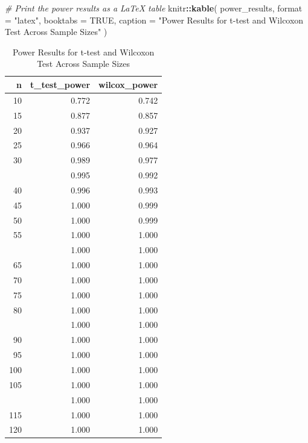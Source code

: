 \documentclass[
]{article}
\newenvironment{Shaded}{\begin{snugshade}}{\end{snugshade}}
\newcommand{\AttributeTok}[1]{\textcolor[rgb]{0.13,0.29,0.53}{#1}}
\newcommand{\CommentTok}[1]{\textcolor[rgb]{0.56,0.35,0.01}{\textit{#1}}}
\newcommand{\ConstantTok}[1]{\textcolor[rgb]{0.56,0.35,0.01}{#1}}
\newcommand{\FunctionTok}[1]{\textcolor[rgb]{0.13,0.29,0.53}{\textbf{#1}}}
\newcommand{\NormalTok}[1]{#1}
\newcommand{\SpecialCharTok}[1]{\textcolor[rgb]{0.81,0.36,0.00}{\textbf{#1}}}
\newcommand{\StringTok}[1]{\textcolor[rgb]{0.31,0.60,0.02}{#1}}
\begin{document}
\begin{Shaded}
\begin{Highlighting}[]
\CommentTok{\# Print the power results as a LaTeX table}
\NormalTok{knitr}\SpecialCharTok{::}\FunctionTok{kable}\NormalTok{(}
\NormalTok{  power\_results,}
  \AttributeTok{format =} \StringTok{"latex"}\NormalTok{,}
  \AttributeTok{booktabs =} \ConstantTok{TRUE}\NormalTok{,}
  \AttributeTok{caption =} \StringTok{"Power Results for t{-}test and Wilcoxon Test Across Sample Sizes"}
\NormalTok{)}
\end{Highlighting}
\end{Shaded}

\begin{table}

\caption{\label{tab:5}Power Results for t-test and Wilcoxon Test Across Sample Sizes}
\centering
\begin{tabular}[t]{rrr}
\toprule
n & t\_test\_power & wilcox\_power\\
\midrule
10 & 0.772 & 0.742\\
15 & 0.877 & 0.857\\
20 & 0.937 & 0.927\\
25 & 0.966 & 0.964\\
30 & 0.989 & 0.977\\
\addlinespace
35 & 0.995 & 0.992\\
40 & 0.996 & 0.993\\
45 & 1.000 & 0.999\\
50 & 1.000 & 0.999\\
55 & 1.000 & 1.000\\
\addlinespace
60 & 1.000 & 1.000\\
65 & 1.000 & 1.000\\
70 & 1.000 & 1.000\\
75 & 1.000 & 1.000\\
80 & 1.000 & 1.000\\
\addlinespace
85 & 1.000 & 1.000\\
90 & 1.000 & 1.000\\
95 & 1.000 & 1.000\\
100 & 1.000 & 1.000\\
105 & 1.000 & 1.000\\
\addlinespace
110 & 1.000 & 1.000\\
115 & 1.000 & 1.000\\
120 & 1.000 & 1.000\\
\bottomrule
\end{tabular}
\end{table}
\end{document}
